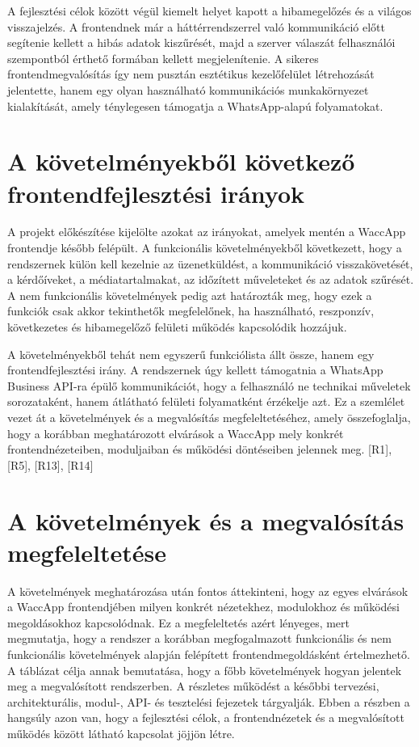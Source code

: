 A fejlesztési célok között végül kiemelt helyet kapott a hibamegelőzés és a világos visszajelzés. A frontendnek már a háttérrendszerrel való kommunikáció előtt segítenie kellett a hibás adatok kiszűrését, majd a szerver válaszát felhasználói szempontból érthető formában kellett megjelenítenie. A sikeres frontendmegvalósítás így nem pusztán esztétikus kezelőfelület létrehozását jelentette, hanem egy olyan használható kommunikációs munkakörnyezet kialakítását, amely ténylegesen támogatja a WhatsApp-alapú folyamatokat.

\section{A követelményekből következő frontendfejlesztési irányok}

A projekt előkészítése kijelölte azokat az irányokat, amelyek mentén a WaccApp frontendje később felépült. A funkcionális követelményekből következett, hogy a rendszernek külön kell kezelnie az üzenetküldést, a kommunikáció visszakövetését, a kérdőíveket, a médiatartalmakat, az időzített műveleteket és az adatok szűrését. A nem funkcionális követelmények pedig azt határozták meg, hogy ezek a funkciók csak akkor tekinthetők megfelelőnek, ha használható, reszponzív, következetes és hibamegelőző felületi működés kapcsolódik hozzájuk.

A követelményekből tehát nem egyszerű funkciólista állt össze, hanem egy frontendfejlesztési irány. A rendszernek úgy kellett támogatnia a WhatsApp Business API-ra épülő kommunikációt, hogy a felhasználó ne technikai műveletek sorozataként, hanem átlátható felületi folyamatként érzékelje azt. Ez a szemlélet vezet át a követelmények és a megvalósítás megfeleltetéséhez, amely összefoglalja, hogy a korábban meghatározott elvárások a WaccApp mely konkrét frontendnézeteiben, moduljaiban és működési döntéseiben jelennek meg. [R1], [R5], [R13], [R14]

\section{A követelmények és a megvalósítás megfeleltetése}

A követelmények meghatározása után fontos áttekinteni, hogy az egyes elvárások a WaccApp frontendjében milyen konkrét nézetekhez, modulokhoz és működési megoldásokhoz kapcsolódnak. Ez a megfeleltetés azért lényeges, mert megmutatja, hogy a rendszer a korábban megfogalmazott funkcionális és nem funkcionális követelmények alapján felépített frontendmegoldásként értelmezhető. A táblázat célja annak bemutatása, hogy a főbb követelmények hogyan jelentek meg a megvalósított rendszerben. A részletes működést a későbbi tervezési, architekturális, modul-, API- és tesztelési fejezetek tárgyalják. Ebben a részben a hangsúly azon van, hogy a fejlesztési célok, a frontendnézetek és a megvalósított működés között látható kapcsolat jöjjön létre.

